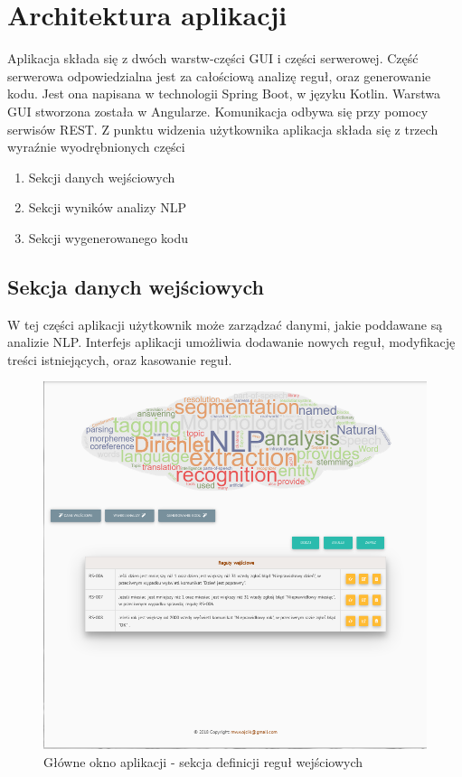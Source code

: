 \section{Architektura aplikacji}

Aplikacja składa się z dwóch warstw-części GUI i części serwerowej. Część serwerowa odpowiedzialna jest za całościową analizę reguł, oraz generowanie kodu. Jest ona napisana w technologii Spring Boot, w języku Kotlin. Warstwa GUI stworzona została w Angularze. Komunikacja odbywa się przy pomocy serwisów REST. 
Z punktu widzenia użytkownika aplikacja składa się z trzech wyraźnie wyodrębnionych części

\begin{enumerate}
	\item Sekcji danych wejściowych
	\item Sekcji wyników analizy NLP
	\item Sekcji wygenerowanego kodu
\end{enumerate}


\subsection{Sekcja danych wejściowych}
W tej części aplikacji użytkownik może zarządzać danymi, jakie poddawane są analizie NLP. Interfejs aplikacji umożliwia dodawanie nowych reguł, modyfikację treści istniejących, oraz kasowanie reguł. 
\begin{figure}[H]
	\centering
	\includegraphics[scale=0.7]{img/app/app-we.png}
	\caption{Główne okno aplikacji - sekcja definicji reguł wejściowych}\label{app-ekran-we}
\end{figure}
